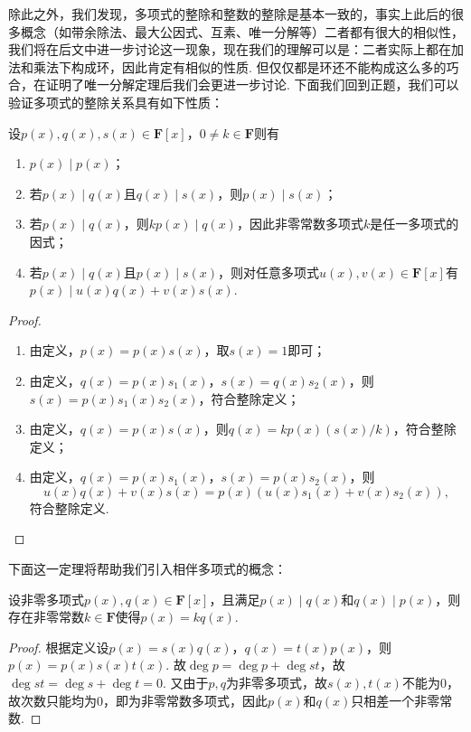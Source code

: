 除此之外，我们发现，多项式的整除和整数的整除是基本一致的，事实上此后的很多概念（如带余除法、最大公因式、互素、唯一分解等）二者都有很大的相似性，我们将在后文中进一步讨论这一现象，现在我们的理解可以是：二者实际上都在加法和乘法下构成环，因此肯定有相似的性质. 但仅仅都是环还不能构成这么多的巧合，在证明了唯一分解定理后我们会更进一步讨论. 下面我们回到正题，我们可以验证多项式的整除关系具有如下性质：
\begin{theorem}
    设$p(x),q(x),s(x)\in\mathbf{F}[x]$，$0\neq k\in\mathbf{F}$则有
    \begin{enumerate}
        \item $p(x)\mid p(x)$；
        \item 若$p(x)\mid q(x)$且$q(x)\mid s(x)$，则$p(x)\mid s(x)$；
        \item 若$p(x)\mid q(x)$，则$kp(x)\mid q(x)$，因此非零常数多项式$k$是任一多项式的因式；
        \item 若$p(x)\mid q(x)$且$p(x)\mid s(x)$，则对任意多项式$u(x),v(x)\in\mathbf{F}[x]$有$p(x)\mid u(x)q(x)+v(x)s(x)$.
    \end{enumerate}
\end{theorem}
\begin{proof}
    \begin{enumerate}
        \item 由定义，$p(x)=p(x)s(x)$，取$s(x)=1$即可；
        \item 由定义，$q(x)=p(x)s_1(x)$，$s(x)=q(x)s_2(x)$，则$s(x)=p(x)s_1(x)s_2(x)$，符合整除定义；
        \item 由定义，$q(x)=p(x)s(x)$，则$q(x)=kp(x)(s(x)/k)$，符合整除定义；
        \item 由定义，$q(x)=p(x)s_1(x)$，$s(x)=p(x)s_2(x)$，则
        \[u(x)q(x)+v(x)s(x)=p(x)(u(x)s_1(x)+v(x)s_2(x)),\]
        符合整除定义.
    \end{enumerate}
\end{proof}

下面这一定理将帮助我们引入相伴多项式的概念：
\begin{theorem}
    设非零多项式$p(x),q(x)\in\mathbf{F}[x]$，且满足$p(x)\mid q(x)$和$q(x)\mid p(x)$，则存在非零常数$k\in\mathbf{F}$使得$p(x)=kq(x)$.
\end{theorem}
\begin{proof}
    根据定义设$p(x)=s(x)q(x)$，$q(x)=t(x)p(x)$，则$p(x)=p(x)s(x)t(x)$. 故$\deg p=\deg p+\deg st$，故$\deg st=\deg s+\deg t=0$. 又由于$p,q$为非零多项式，故$s(x),t(x)$不能为$0$，故次数只能均为$0$，即为非零常数多项式，因此$p(x)$和$q(x)$只相差一个非零常数.
\end{proof}

